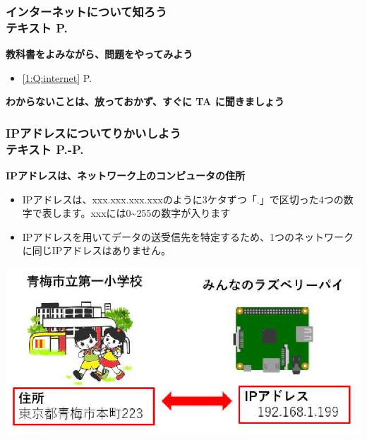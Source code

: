 \begin{frame}[fragile]
	\frametitle{インターネットについて知ろう\\テキスト P.\pageref{1:P:internet}~~~}
    \large\textbf{教科書をよみながら、問題をやってみよう}
				\begin{itemize}\small
					\item \ref*{1:Q:internet} P.\pageref{1:Q:internet}
				\end{itemize}
      \vfill
      \large\textbf{わからないことは、放っておかず、すぐに TA に聞きましょう}
\end{frame}

\begin{frame}[fragile]
	\frametitle{\large{IPアドレスについてりかいしよう\\テキスト P.\pageref{1:P:IP}-P.\pageref{1:P:port}}~~~}
     \textbf{IPアドレスは、ネットワーク上のコンピュータの住所}
          \begin{itemize}\small
             \item IPアドレスは、xxx.xxx.xxx.xxxのように3ケタずつ「.」で区切った4つの数字で表します。xxxには0{\textasciitilde}255の数字が入ります
             \item IPアドレスを用いてデータの送受信先を特定するため、1つのネットワークに同じIPアドレスはありません。
         \end{itemize}
         \vfill
            
		\begin{minipage}{\textwidth}
             {\upshape
                \includegraphics[scale=0.6]{text07-img/ome7-img003}}
        \end{minipage}
\end{frame}

